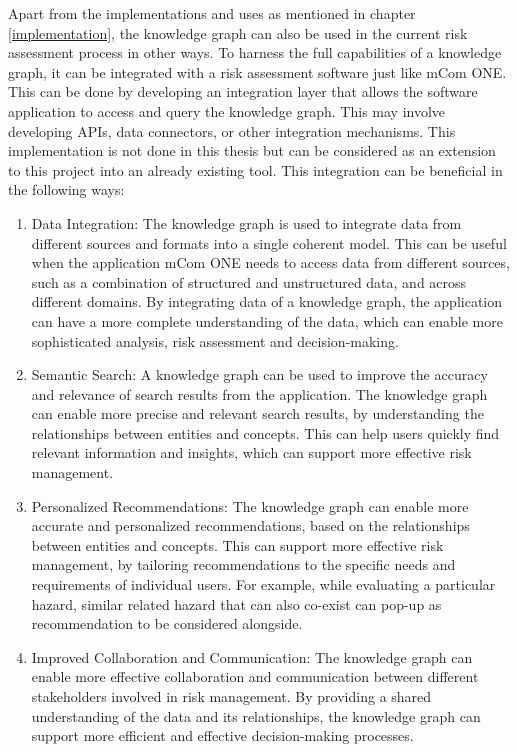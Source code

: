 Apart from the implementations and uses as mentioned in chapter \ref{implementation}, the knowledge graph can also be used in the current risk assessment process in other ways. To harness the full capabilities of a knowledge graph, it can be integrated with a risk assessment software just like mCom ONE. This can be done by developing an integration layer that allows the software application to access and query the knowledge graph. This may involve developing APIs, data connectors, or other integration mechanisms. This implementation is not done in this thesis but can be considered as an extension to this project into an already existing tool. This integration can be beneficial in the following ways:

\begin{enumerate}
    \item Data Integration: The knowledge graph is used to integrate data from different sources and formats into a single coherent model. This can be useful when the application mCom ONE needs to access data from different sources, such as a combination of structured and unstructured data, and across different domains. By integrating data of a knowledge graph, the application can have a more complete understanding of the data, which can enable more sophisticated analysis, risk assessment and decision-making. 
    \item Semantic Search: A knowledge graph can be used to improve the accuracy and relevance of search results from the application. The knowledge graph can enable more precise and relevant search results, by understanding the relationships between entities and concepts. This can help users quickly find relevant information and insights, which can support more effective risk management.
    \item Personalized Recommendations: The knowledge graph can enable more accurate and personalized recommendations, based on the relationships between entities and concepts. This can support more effective risk management, by tailoring recommendations to the specific needs and requirements of individual users. For example, while evaluating a particular hazard, similar related hazard that can also co-exist can pop-up as recommendation to be considered alongside.
    \item Improved Collaboration and Communication: The knowledge graph can enable more effective collaboration and communication between different stakeholders involved in risk management. By providing a shared understanding of the data and its relationships, the knowledge graph can support more efficient and effective decision-making processes.
\end{enumerate}

